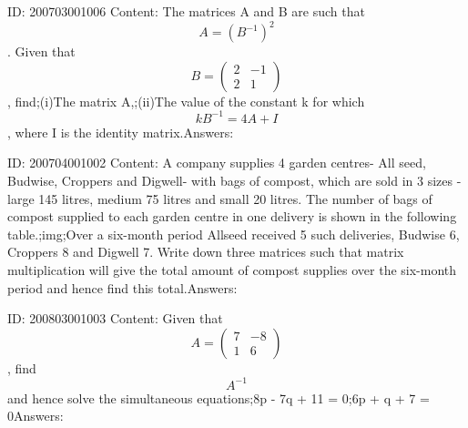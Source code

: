 \documentclass{article}
\begin{document}
ID: 200703001006
Content:
The matrices A and B are such that $$A=(B^{-1})^2$$. Given that $$B=\begin{pmatrix}2 &-1 \\ 2 &1 \end{pmatrix}$$, find;(i)The matrix A,;(ii)The value of the constant k for which $$kB^{-1}=4A+I$$, where I is the identity matrix.Answers:

ID: 200704001002
Content:
A company supplies 4 garden centres- All seed, Budwise, Croppers and Digwell- with bags of compost, which are sold in 3 sizes -large 145 litres, medium 75 litres and small 20 litres. The number of bags of compost supplied to each garden centre in one delivery is shown in the following table.;img;Over a six-month period Allseed received 5 such deliveries, Budwise 6, Croppers 8 and Digwell 7. Write down three matrices such that matrix multiplication will give the total amount of compost supplies over the six-month period and hence find this total.Answers:

ID: 200803001003
Content:
Given that $$A = \begin{pmatrix}7 & -8\\  1& 6\end{pmatrix}$$, find $$A^{-1}$$ and hence solve the simultaneous equations;8p - 7q + 11 = 0;6p + q + 7 = 0Answers:
\end{document}
